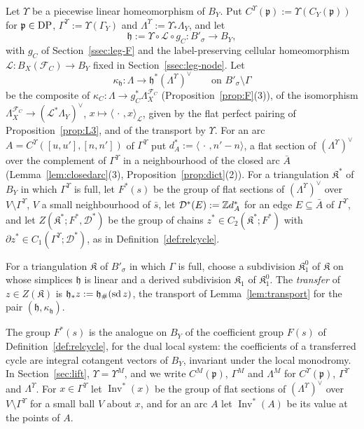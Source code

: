 \begin{definition}\label{def:transfer}
Let $\Upsilon$ be a piecewise linear homeomorphism of $B_Y$. Put $C^\Upsilon({\mathfrak p}):=\Upsilon(C_Y({\mathfrak p}))$ for ${\mathfrak p}\in\mathrm{DP}$,
$\Gamma^\Upsilon:=\Upsilon(\Gamma_Y)$ and $\Lambda^\Upsilon:=\Upsilon_*\Lambda_Y$, and let
\[
\mathfrak h:=\Upsilon\circ\mathcal L\circ g_C\colon B'_\sigma\longrightarrow B_Y,
\]
with $g_C$ of Section~\ref{ssec:leg-F} and the label-preserving cellular homeomorphism $\mathcal L\colon B_X(\mathcal F_C)\to B_Y$ fixed in
Section~\ref{ssec:leg-node}. Let
\[
\kappa_{\mathfrak h}\colon\Lambda\longrightarrow \mathfrak h^*(\Lambda^\Upsilon)^\vee\qquad\text{on }B'_\sigma\setminus\Gamma
\]
be the composite of $\kappa_C\colon\Lambda\to g_C^*\Lambda^{\mathcal F_C}_X$ (Proposition~\ref{prop:F}(3)), of the
isomorphism $\Lambda^{\mathcal F_C}_X\to(\mathcal L^*\Lambda_Y)^\vee$, $x\mapsto\langle\,\cdot\,,x\rangle_{\mathcal L}$, given by the flat
perfect pairing of Proposition~\ref{prop:L3}, and of the transport by $\Upsilon$. For an arc
$A=C^\Upsilon([u,u'],[n,n'])$ of $\Gamma^\Upsilon$ put $d^*_A:=\langle\,\cdot\,,n'-n\rangle$, a flat section of
$(\Lambda^\Upsilon)^\vee$ over the complement of $\Gamma^\Upsilon$ in a neighbourhood of the closed arc $\bar A$
(Lemma~\ref{lem:closedarc}(3), Proposition~\ref{prop:dict}(2)). For a triangulation $\mathfrak K^*$ of $B_Y$ in which
$\Gamma^\Upsilon$ is full, let $F^*(s)$ be the group of flat sections of $(\Lambda^\Upsilon)^\vee$ over
$V\setminus\Gamma^\Upsilon$, $V$ a small neighbourhood of $\bar s$, let $\mathcal D^*(E):=\mathbb Z d^*_A$ for an edge
$E\subseteq\bar A$ of $\Gamma^\Upsilon$, and let $Z(\mathfrak K^*;F^*,\mathcal D^*)$ be the group of chains
$z^*\in C_2(\mathfrak K^*;F^*)$ with $\partial z^*\in C_1(\Gamma^\Upsilon;\mathcal D^*)$, as in
Definition~\ref{def:relcycle}.

For a triangulation $\mathfrak K$ of $B'_\sigma$ in which $\Gamma$ is full, choose a subdivision $\mathfrak K^0_1$ of
$\mathfrak K$ on whose simplices $\mathfrak h$ is linear and a derived subdivision $\mathfrak K_1$ of $\mathfrak K^0_1$. The
\emph{transfer} of $z\in Z(\mathfrak K)$ is $\mathfrak h_*z:=\mathfrak h_\#(\operatorname{sd} z)$, the transport of Lemma~\ref{lem:transport} for the pair
$(\mathfrak h,\kappa_{\mathfrak h})$.
\end{definition}

The group $F^*(s)$ is the analogue on $B_Y$ of the coefficient group $F(s)$ of Definition~\ref{def:relcycle}, for the
dual local system: the coefficients of a transferred cycle are integral cotangent vectors of $B_Y$, invariant under the
local monodromy. In Section~\ref{sec:lift}, $\Upsilon=\Upsilon^M$, and we write $C^M({\mathfrak p})$, $\Gamma^M$ and $\Lambda^M$ for
$C^\Upsilon({\mathfrak p})$, $\Gamma^\Upsilon$ and $\Lambda^\Upsilon$. For $x\in\Gamma^\Upsilon$ let
$\operatorname{Inv}^*(x)$ be the group of flat sections of $(\Lambda^\Upsilon)^\vee$ over $V\setminus\Gamma^\Upsilon$ for a
small ball $V$ about $x$, and for an arc $A$ let $\operatorname{Inv}^*(A)$ be its value at the points of $A$.

